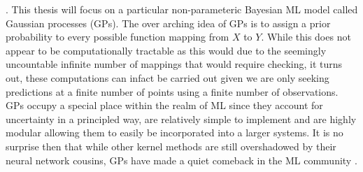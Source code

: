 \cite{RasmussenCarlEdward2006Gpfm}. This thesis will focus on a particular non-parameteric Bayesian ML model called Gaussian processes (GPs). The over arching idea of GPs is to assign a prior probability to every possible function mapping from $X$ to $Y$. While this does not appear to be computationally tractable as this would due to the seemingly uncountable infinite number of mappings that would require checking, it turns out, these computations can infact be carried out given we are only seeking predictions at a finite number of points using a finite number of observations. GPs occupy a special place within the realm of ML since they account for uncertainty in a principled way, are relatively simple to implement and are highly modular allowing them to easily be incorporated into a larger systems. It is no surprise then that while other kernel methods are still overshadowed by their neural network cousins, GPs have made a quiet comeback in the ML community \cite{cao2018scaling}.

